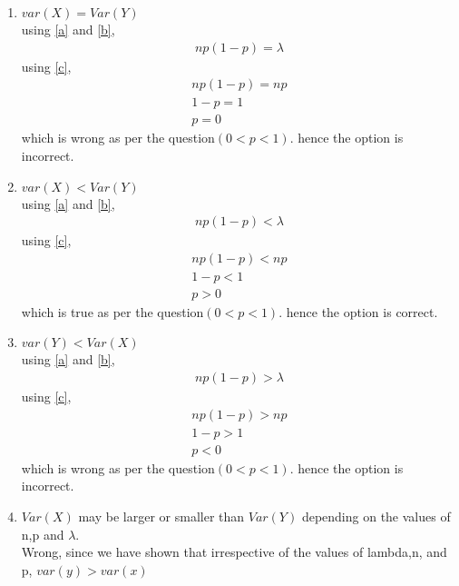 \documentclass[journal,12pt,twocolumn]{IEEEtran}
\begin{document}
\begin{enumerate}
    \item $var(X)=Var(Y)$\\
          using \eqref{a} and \eqref{b},
          \begin{align}
          np(1-p) = \lambda
          \end{align}
          using \eqref{c},
          \begin{align}
          np(1-p) = np\\
          1-p=1\\
          p=0
          \end{align}
          which is wrong as per the question$(0<p<1)$.
          hence the option is incorrect.
    \item $var(X)<Var(Y)$\\
          using \eqref{a} and \eqref{b},
          \begin{align}
          np(1-p) < \lambda
          \end{align}
          using \eqref{c},
          \begin{align}
          np(1-p) < np\\
          1-p<1\\
          p>0
          \end{align}
          which is true as per the question$(0<p<1)$.
          hence the option is correct.
    \item $var(Y)<Var(X)$\\
    using \eqref{a} and \eqref{b},
          \begin{align}
          np(1-p) > \lambda
          \end{align}
          using \eqref{c},
          \begin{align}
          np(1-p) > np\\
          1-p>1\\
          p<0
          \end{align}
          which is wrong as per the question$(0<p<1)$.
          hence the option is incorrect.
    \item $Var(X)$ may be larger or smaller than $Var(Y)$ depending on the values of n,p and $\lambda$.\\
    Wrong, since we have shown that irrespective of the values of lambda,n, and p, $var(y) > var(x)$
\end{enumerate}
\end{document}

